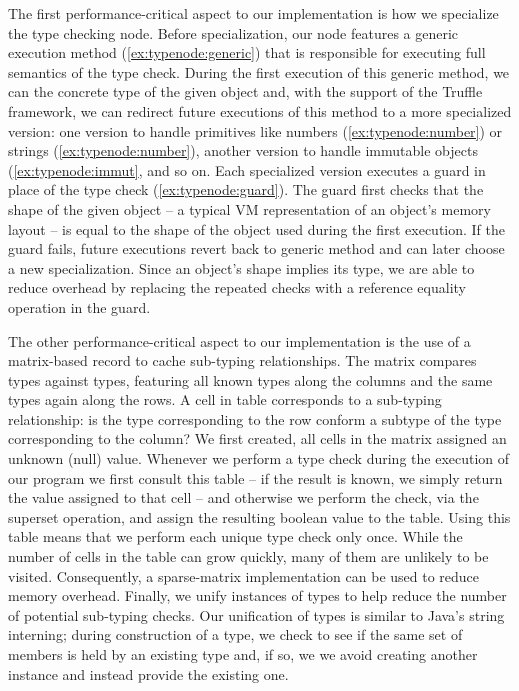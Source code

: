 The first performance-critical aspect to our implementation
is how we specialize the type checking node.
Before specialization,
our node features a generic execution method
(\cref{ex:typenode:generic})
that is responsible for executing full semantics of the type check.
During the first execution of this generic method,
we can the concrete type of the given object and,
with the support of the Truffle framework,
we can redirect future executions of this method
to a more specialized version:
one version to handle primitives like
numbers (\cref{ex:typenode:number}) or strings (\cref{ex:typenode:number}),
another version to handle immutable objects (\cref{ex:typenode:immut},
and so on.
Each specialized version executes a guard in place of the type check (\cref{ex:typenode:guard}).
The guard first checks that the shape of the given object
-- a typical VM representation of an object's memory layout --
is equal to the shape of the object
used during the first execution.
If the guard fails,
future executions revert back to generic method
and can later choose a new specialization.
Since an object's shape implies its type,
we are able to reduce overhead
by replacing the repeated checks
with a reference equality operation in the guard.

The other performance-critical aspect to our implementation
is the use of a matrix-based record to cache sub-typing relationships.
The matrix compares types against types,
featuring all known types along the columns and the same types again along the rows.
A cell in table corresponds to a sub-typing relationship:
is the type corresponding to the row conform a subtype of the type corresponding to the column?
We first created, all cells in the matrix assigned an unknown (null) value.
Whenever we perform a type check during the execution of our program we 
first consult this table
-- if the result is known, we simply return the value assigned to that cell --
and otherwise we perform the check, via the superset operation,
and assign the resulting boolean value to the table.
Using this table means that we perform each unique type check only once.
While the number of cells in the table can grow quickly,
many of them are unlikely to be visited. 
Consequently, a sparse-matrix implementation can be used to reduce memory overhead.
Finally,
we unify instances of types to help reduce the number of potential sub-typing checks.
Our unification of types is similar to Java's string interning; 
during construction of a type,
we check to see if the same set of members is held
by an existing type and, if so,
we we avoid creating another instance and instead
provide the existing one.


